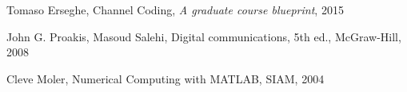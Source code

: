 \documentclass[10pt]{article}
\begin{document}
\begin{thebibliography}{10}

 Tomaso Erseghe, Channel Coding, \emph{A graduate course blueprint}, 2015

 John G. Proakis, Masoud Salehi, Digital communications, 5th ed., McGraw-Hill, 2008

 Cleve Moler, Numerical Computing with MATLAB, SIAM, 2004

\end{thebibliography}
\end{document}

